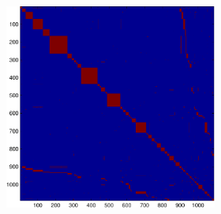 \documentclass{article} %
\begin{document}
\begin{figure}
\begin{subfigure}[c]{\textwidth}
\begin{subfigure}[]{0.195\textwidth}
			\label{fig:2_21_s_su}
		\end{subfigure}
		\begin{subfigure}[c]{0.195\textwidth}
			\includegraphics[width = \textwidth]{./img/adj2_21_s.pdf}
			\label{fig2_21_s_adj}
		\end{subfigure}
	\end{subfigure}


\end{figure}
\end{document}

